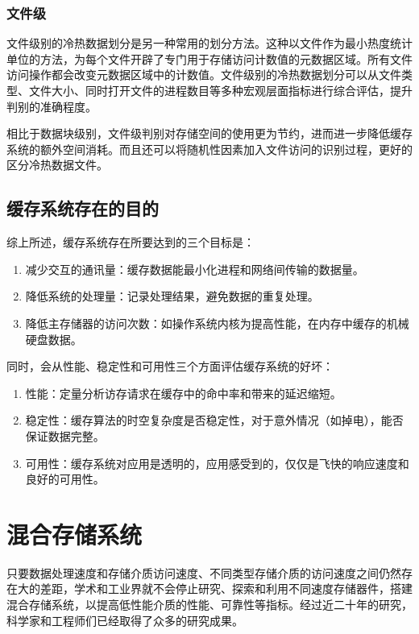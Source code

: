 \subsubsection{文件级}

文件级别的冷热数据划分\cite{linlin2011}是另一种常用的划分方法。这种以文件作为最小热度统计单位的方法，为每个文件开辟了专门用于存储访问计数值的元数据区域。所有文件访问操作都会改变元数据区域中的计数值。文件级别的冷热数据划分可以从文件类型、文件大小、同时打开文件的进程数目等多种宏观层面指标进行综合评估，提升判别的准确程度。

相比于数据块级别，文件级判别对存储空间的使用更为节约，进而进一步降低缓存系统的额外空间消耗。而且还可以将随机性因素加入文件访问的识别过程，更好的区分冷热数据文件。

\subsection{缓存系统存在的目的}
综上所述，缓存系统存在所要达到的三个目标是：
\begin{enumerate}
\item 减少交互的通讯量：缓存数据能最小化进程和网络间传输的数据量。
\item 降低系统的处理量：记录处理结果，避免数据的重复处理。
\item 降低主存储器的访问次数：如操作系统内核为提高性能，在内存中缓存的机械硬盘数据。
\end{enumerate}

同时，会从性能、稳定性和可用性三个方面评估缓存系统的好坏：
\begin{enumerate}
\item 性能：定量分析访存请求在缓存中的命中率和带来的延迟缩短。
\item 稳定性：缓存算法的时空复杂度是否稳定性，对于意外情况（如掉电），能否保证数据完整。
\item 可用性：缓存系统对应用是透明的，应用感受到的，仅仅是飞快的响应速度和良好的可用性。
\end{enumerate}

\section{混合存储系统}
\label{sec:hybrid_storage}

只要数据处理速度和存储介质访问速度、不同类型存储介质的访问速度之间仍然存在大的差距，学术和工业界就不会停止研究、探索和利用不同速度存储器件，搭建混合存储系统\cite{zhuqing2013hybrid}，以提高低性能介质的性能、可靠性等指标。经过近二十年的研究，科学家和工程师们已经取得了众多的研究成果。

